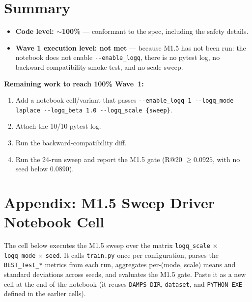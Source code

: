 \documentclass[11pt, a4paper]{article}
\begin{document}
\section{Summary}

\begin{itemize}[leftmargin=*]
  \item \textbf{Code level: $\sim$100\%} --- conformant to the spec, including the
    safety details.
  \item \textbf{Wave 1 execution level: not met} --- because M1.5 has not been run:
    the notebook does not enable \texttt{-{}-enable\_logq}, there is no pytest log, no
    backward-compatibility smoke test, and no scale sweep.
\end{itemize}

\noindent\textbf{Remaining work to reach 100\% Wave~1:}
\begin{enumerate}[leftmargin=*]
  \item Add a notebook cell/variant that passes
    \texttt{-{}-enable\_logq 1 -{}-logq\_mode laplace -{}-logq\_beta 1.0 -{}-logq\_scale \{sweep\}}.
  \item Attach the 10/10 pytest log.
  \item Run the backward-compatibility diff.
  \item Run the 24-run sweep and report the M1.5 gate
    (R@20 $\geq 0.0925$, with no seed below $0.0890$).
\end{enumerate}

\section{Appendix: M1.5 Sweep Driver Notebook Cell}

The cell below executes the M1.5 sweep over the matrix
\texttt{logq\_scale} $\times$ \texttt{logq\_mode} $\times$ \texttt{seed}. It calls
\texttt{train.py} once per configuration, parses the \texttt{BEST\_Test\_*} metrics
from each run, aggregates per-(mode, scale) means and standard deviations across
seeds, and evaluates the M1.5 gate. Paste it as a new cell at the end of the
notebook (it reuses \texttt{DAMPS\_DIR}, \texttt{dataset}, and \texttt{PYTHON\_EXE}
defined in the earlier cells).
\end{document}
